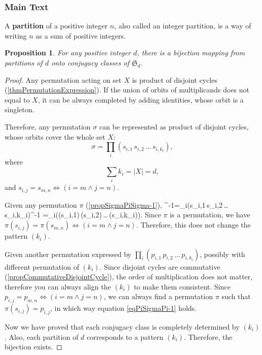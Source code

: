 \documentclass[12pt, letterpaper]{article}
\newcommand{\card}[1]{\left\lvert #1 \right\rvert}
\newenvironment{eqlong}{\equation\aligned}{\endaligned\endequation}
\newtheorem{prop}{Proposition}[section]
\theoremstyle{definition}
\theoremstyle{remark}
\theoremstyle{definition}
\theoremstyle{plain}
\numberwithin{equation}{section}
\begin{document}
	\subsubsection{Main Text}
	\begin{def*}[partition]
		A \textbf{partition} of a positive integer $n$, also called an integer partition, is a way of writing $n$ as a sum of positive integers.
	\end{def*}
	\begin{prop}
		For any positive integer $d$,
		there is a bijection mapping from partitions of $d$ onto conjugacy classes of $\mathfrak{S}_d$.
	\end{prop}
	\begin{proof}
		Any permutation acting on set $X$ is product of disjoint cycles (\autoref{thmPermutationExpression}).
		If the union of orbits of multiplicands does not equal to $X$,
		it can be always completed by adding identities, whose orbit is a singleton.
		
		Therefore, any permutation $\sigma$ can be represented as product of disjoint cycles,
		whose orbits cover the whole set $X$:
		\[\sigma=\prod_i(s_{i,1}\,s_{i,2}\,\dots\,s_{i,k_i}),\]
		where
		\[\sum_{i}k_i=\card{X}=d,\]
		and $s_{i,j}= s_{m,n}\iff (i=m\land j=n)$.
		
		Given any permutation $\pi$ (\autoref{propSigmaPiSigma-1}),
		\begin{eqlong}\label{eqPiSigmaPi-1}
			\pi\circ\sigma\circ\pi^{-1}=\prod_i\pi\circ(s_{i,1}\,s_{i,2}\,\dots\,s_{i,k_i})\circ\pi^{-1}
			=\prod_i(\pi(s_{i,1})\,\pi(s_{i,2})\,\dots\,\pi(s_{i,k_i})).
		\end{eqlong}
		Since $\pi$ is a permutation,
		we have $\pi(s_{i,j})= \pi(s_{m,n})\iff (i=m\land j=n)$.
		Therefore, this does not change the pattern $(k_i)$.
		
		Given another permutation expressed by $\prod_i(p_{i,1}\,p_{i,2}\,\dots\,p_{i,k_i})$,
		possibly with different permutation of $(k_i)$.
		Since disjoint cycles are commutative (\autoref{propCommutativeDisjointCycle}),
		the order of multiplication does not matter,
		therefore you can always align the $(k_i)$ to make them consistent.
		Since $p_{i,j}= p_{m,n}\iff (i=m\land j=n)$, we can always find a permutation $\pi$
		such that $\pi(s_{i,j})=p_{i,j}$, in which way equation \eqref{eqPiSigmaPi-1} holds.
		
		Now we have proved that each conjugacy class is completely determined by $(k_i)$.
		Also, each partition of $d$ corresponds to a pattern $(k_i)$.
		Therefore, the bijection exists.		
	\end{proof}
\end{document}

